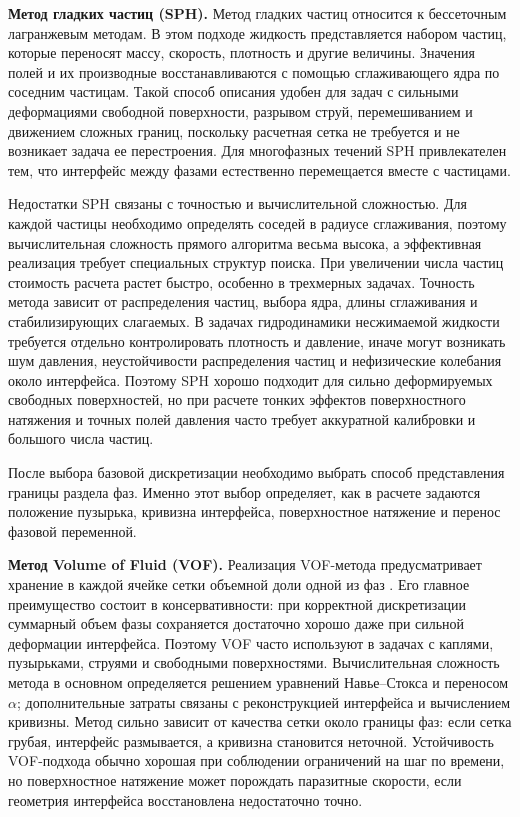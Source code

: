 \textbf{Метод гладких частиц (SPH).}
Метод гладких частиц относится к бессеточным лагранжевым
методам. В этом подходе жидкость представляется набором частиц, которые
переносят массу, скорость, плотность и другие величины. Значения полей и их
производные восстанавливаются с помощью сглаживающего ядра по соседним
частицам. Такой способ описания удобен для задач с сильными деформациями
свободной поверхности, разрывом струй, перемешиванием и движением сложных
границ, поскольку расчетная сетка не требуется и не возникает задача ее
перестроения. Для многофазных течений SPH привлекателен тем, что интерфейс
между фазами естественно перемещается вместе с частицами.

Недостатки SPH связаны с точностью и вычислительной сложностью. Для каждой
частицы необходимо определять соседей в радиусе сглаживания, поэтому вычислительная сложность прямого алгоритма весьма высока, а эффективная реализация требует специальных структур поиска. При
увеличении числа частиц стоимость расчета растет быстро, особенно в трехмерных
задачах. Точность метода зависит от распределения частиц, выбора ядра,
длины сглаживания и стабилизирующих слагаемых. В задачах
гидродинамики несжимаемой жидкости требуется отдельно контролировать плотность и давление, иначе
могут возникать шум давления, неустойчивости распределения частиц и
нефизические колебания около интерфейса. Поэтому SPH хорошо подходит для
сильно деформируемых свободных поверхностей, но при расчете тонких эффектов
поверхностного натяжения и точных полей давления часто требует аккуратной
калибровки и большого числа частиц.

После выбора базовой дискретизации необходимо выбрать способ представления
границы раздела фаз. Именно этот выбор определяет, как в расчете задаются
положение пузырька, кривизна интерфейса, поверхностное натяжение и перенос
фазовой переменной.

\textbf{Метод Volume of Fluid (VOF).}
Реализация VOF-метода предусматривает хранение в каждой ячейке сетки объемной доли одной из фаз
\cite{Hirt1981}. Его главное преимущество состоит в консервативности: при
корректной дискретизации суммарный объем фазы сохраняется достаточно хорошо
даже при сильной деформации интерфейса. Поэтому VOF часто используют в задачах
с каплями, пузырьками, струями и свободными поверхностями. Вычислительная
сложность метода в основном определяется решением уравнений Навье--Стокса и
переносом \(\alpha\); дополнительные затраты связаны с реконструкцией
интерфейса и вычислением кривизны. Метод сильно зависит от качества сетки около
границы фаз: если сетка грубая, интерфейс размывается, а кривизна становится
неточной. Устойчивость VOF-подхода обычно хорошая при соблюдении ограничений на
шаг по времени, но поверхностное натяжение может порождать паразитные скорости,
если геометрия интерфейса восстановлена недостаточно точно.

